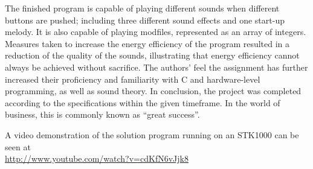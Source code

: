The finished program is capable of playing different sounds when different buttons are pushed; including three different sound effects and one start-up melody.
It is also capable of playing modfiles, represented as an array of integers.
Measures taken to increase the energy efficiency of the program resulted in a reduction of the quality of the sounds, illustrating that energy efficiency cannot always be achieved without sacrifice.
The authors' feel the assignment has further increased their proficiency and familiarity with C and hardware-level programming, as well as sound theory.
In conclusion, the project was completed according to the specifications within the given timeframe.
In the world of business, this is commonly known as ``great success''.

\begin{center}
A video demonstration of the solution program running on an STK1000 can be seen at \\
\url{http://www.youtube.com/watch?v=cdKfN6vJjk8}
\end{center}
